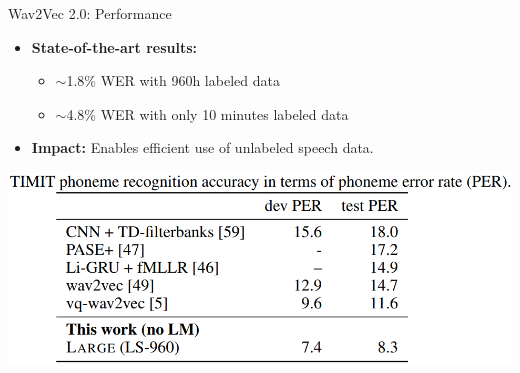 \begin{frame}{Wav2Vec 2.0: Performance}
    \begin{itemize}
        \item \textbf{State-of-the-art results:}
        \begin{itemize}
            \item $\sim$1.8\% WER with 960h labeled data
            \item $\sim$4.8\% WER with only 10 minutes labeled data
        \end{itemize}
        \item \textbf{Impact:} Enables efficient use of unlabeled speech data.
    \end{itemize}
    \begin{center}
        \includegraphics[width=\textwidth]{images/audio-nlp/wav2vec2-results.png}
    \end{center}
\end{frame}